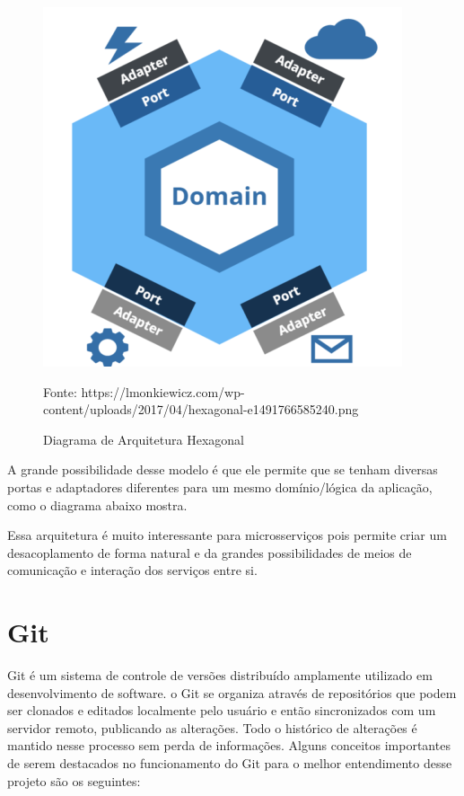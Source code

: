 \documentclass[twosideprint]{politex}
\newcommand{\legend}[1]{\begin{center}\def\caption{}\caption{#1}\end{center}}
\begin{document}
	\begin{figure}[htpb]
	    \caption{Diagrama de Arquitetura Hexagonal}
	    \begin{center}
	        \includegraphics[scale=0.6]{pictures/hexagonal1.png}
	    \end{center}
	    \label{fig:hexagonal1}
	    \legend{Fonte: https://lmonkiewicz.com/wp-content/uploads/2017/04/hexagonal-e1491766585240.png}
	\end{figure}

	A grande possibilidade desse modelo é que ele permite que se tenham diversas portas e adaptadores diferentes para um mesmo domínio/lógica da aplicação, como o diagrama abaixo mostra.
	
	Essa arquitetura é muito interessante para microsserviços pois permite criar um desacoplamento de forma natural e da grandes possibilidades de meios de comunicação e interação dos serviços entre si.
	
	\section{Git}
	
	Git é um sistema de controle de versões distribuído amplamente utilizado em desenvolvimento de software. o Git se organiza através de repositórios que podem ser clonados e editados localmente pelo usuário e então sincronizados com um servidor remoto, publicando as alterações. Todo o histórico de alterações é mantido nesse processo sem perda de informações.
	Alguns conceitos importantes de serem destacados no funcionamento do Git para o melhor entendimento desse projeto são os seguintes:
	
\end{document}
